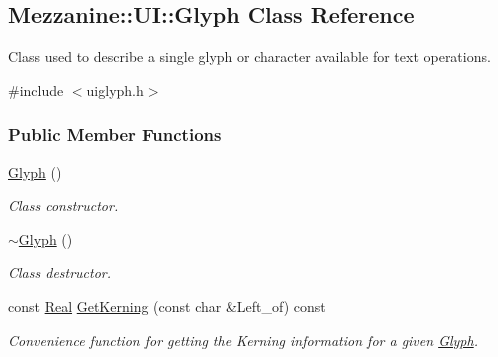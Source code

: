\hypertarget{classMezzanine_1_1UI_1_1Glyph}{
\subsection{Mezzanine::UI::Glyph Class Reference}
\label{classMezzanine_1_1UI_1_1Glyph}
}


Class used to describe a single glyph or character available for text operations.  




{\ttfamily \#include $<$uiglyph.h$>$}

\subsubsection*{Public Member Functions}
\begin{DoxyCompactItemize}
\item 
\hypertarget{classMezzanine_1_1UI_1_1Glyph_a7805e127ac5e7ab54bd4f95215209860}{
\hyperlink{classMezzanine_1_1UI_1_1Glyph_a7805e127ac5e7ab54bd4f95215209860}{Glyph} ()}
\label{classMezzanine_1_1UI_1_1Glyph_a7805e127ac5e7ab54bd4f95215209860}

\begin{DoxyCompactList}\small\item\em Class constructor. \item\end{DoxyCompactList}\item 
\hypertarget{classMezzanine_1_1UI_1_1Glyph_a4c05630aaf8f59b21ecdd2357a9c7edb}{
\hyperlink{classMezzanine_1_1UI_1_1Glyph_a4c05630aaf8f59b21ecdd2357a9c7edb}{$\sim$Glyph} ()}
\label{classMezzanine_1_1UI_1_1Glyph_a4c05630aaf8f59b21ecdd2357a9c7edb}

\begin{DoxyCompactList}\small\item\em Class destructor. \item\end{DoxyCompactList}\item 
const \hyperlink{namespaceMezzanine_a726731b1a7df72bf3583e4a97282c6f6}{Real} \hyperlink{classMezzanine_1_1UI_1_1Glyph_aaff687e74932eaea602316a72596c82f}{GetKerning} (const char \&Left\_\-of) const 
\begin{DoxyCompactList}\small\item\em Convenience function for getting the Kerning information for a given \hyperlink{classMezzanine_1_1UI_1_1Glyph}{Glyph}. \item\end{DoxyCompactList}\end{DoxyCompactItemize}

